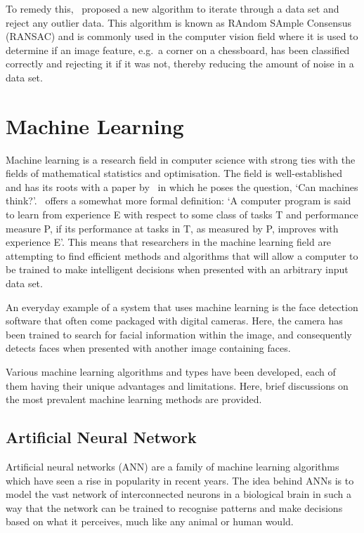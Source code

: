 To remedy this,~\cite{fischler1981random} proposed a new algorithm to iterate through a data set and reject any outlier data. This algorithm is known as RAndom SAmple Consensus (RANSAC) and is commonly used in the computer vision field where it is used to determine if an image feature, e.g.\ a corner on a chessboard, has been classified correctly and rejecting it if it was not, thereby reducing the amount of noise in a data set. 

\section{Machine Learning}

Machine learning is a research field in computer science with strong ties with the fields of mathematical statistics and optimisation. The field is well-established and has its roots with a paper by~\cite{turing1950computing} in which he poses the question, `Can machines think?'.~\cite{michalski2013machine} offers a somewhat more formal definition: `A computer program is said to learn from experience E with respect to some class of tasks T and performance measure P, if its performance at tasks in T, as measured by P, improves with experience E'. This means that researchers in the machine learning field are attempting to find efficient methods and algorithms that will allow a computer to be trained to make intelligent decisions when presented with an arbitrary input data set. 

An everyday example of a system that uses machine learning is the face detection software that often come packaged with digital cameras. Here, the camera has been trained to search for facial information within the image, and consequently detects faces when presented with another image containing faces.

Various machine learning algorithms and types have been developed, each of them having their unique advantages and limitations. Here, brief discussions on the most prevalent machine learning methods are provided. 

\subsection{Artificial Neural Network}

Artificial neural networks (ANN) are a family of machine learning algorithms which have seen a rise in popularity in recent years. The idea behind ANNs is to model the vast network of interconnected neurons in a biological brain in such a way that the network can be trained to recognise patterns and make decisions based on what it perceives, much like any animal or human would. 

